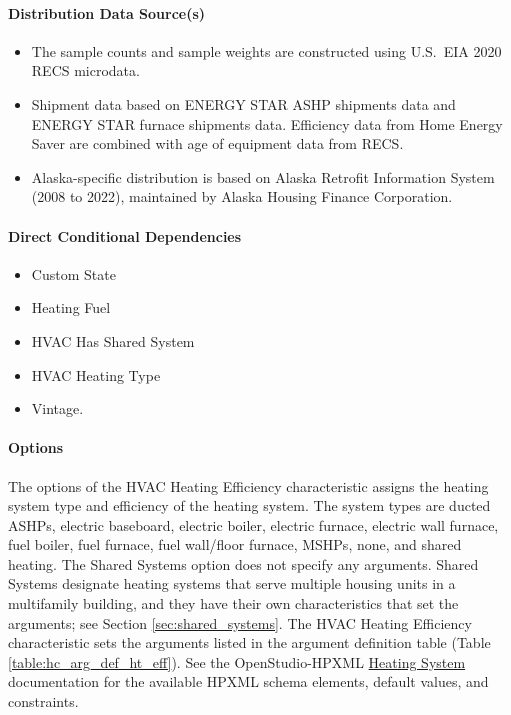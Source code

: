 \paragraph{Distribution Data Source(s)}
\begin{itemize}
    \item The sample counts and sample weights are constructed using U.S.~EIA 2020 RECS microdata. 
    \item Shipment data based on ENERGY STAR ASHP shipments data and ENERGY STAR furnace shipments data. Efficiency data from Home Energy Saver are combined with age of equipment data from RECS. 
    \item Alaska-specific distribution is based on Alaska Retrofit Information System (2008 to 2022), maintained by Alaska Housing Finance Corporation.
\end{itemize}

\paragraph{Direct Conditional Dependencies}
\begin{itemize}
    \item Custom State
    \item Heating Fuel
    \item HVAC Has Shared System
    \item HVAC Heating Type
    \item Vintage.
\end{itemize}

\paragraph{Options}
The options of the HVAC Heating Efficiency characteristic assigns the heating system type and efficiency of the heating system. The system types are ducted ASHPs, electric baseboard, electric boiler, electric furnace, electric wall furnace, fuel boiler, fuel furnace, fuel wall/floor furnace, MSHPs, none, and shared heating. The Shared Systems option does not specify any arguments. Shared Systems designate heating systems that serve multiple housing units in a multifamily building, and they have their own characteristics that set the arguments; see Section \ref{sec:shared_systems}. The HVAC Heating Efficiency characteristic sets the arguments listed in the argument definition table (Table \ref{table:hc_arg_def_ht_eff}). See the OpenStudio-HPXML \href{https://openstudio-hpxml.readthedocs.io/en/v1.8.1/workflow_inputs.html#hpxml-heating-systems}{Heating System} documentation for the available HPXML schema elements, default values, and constraints.

